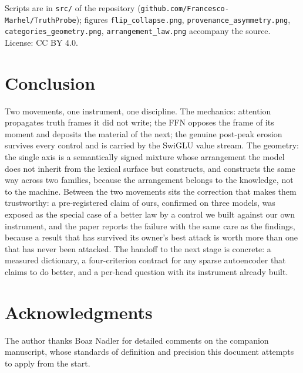 \documentclass[11pt]{article}
\begin{document}
Scripts are in \texttt{src/} of the repository
(\texttt{github.com/Francesco-Marhel/TruthProbe}); figures
\texttt{flip\_collapse.png}, \texttt{provenance\_asymmetry.png},
\texttt{categories\_geometry.png}, \texttt{arrangement\_law.png} accompany
the source. License: CC BY 4.0.

\section{Conclusion}

Two movements, one instrument, one discipline. The mechanics: attention
propagates truth frames it did not write; the FFN opposes the frame of its
moment and deposits the material of the next; the genuine post-peak erosion
survives every control and is carried by the SwiGLU value stream. The
geometry: the single axis is a semantically signed mixture whose
arrangement the model does not inherit from the lexical surface but
constructs, and constructs the same way across two families, because the
arrangement belongs to the knowledge, not to the machine. Between the two
movements sits the correction that makes them trustworthy: a pre-registered
claim of ours, confirmed on three models, was exposed as the special case
of a better law by a control we built against our own instrument, and the
paper reports the failure with the same care as the findings, because a
result that has survived its owner's best attack is worth more than one
that has never been attacked. The handoff to the next stage is concrete: a
measured dictionary, a four-criterion contract for any sparse autoencoder
that claims to do better, and a per-head question with its instrument
already built.

\section*{Acknowledgments}

The author thanks Boaz Nadler for detailed comments on the companion
manuscript, whose standards of definition and precision this document
attempts to apply from the start.
\end{document}
